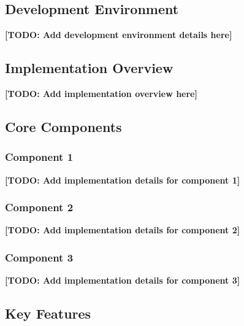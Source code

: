 
\subsection{Development Environment}


\textbf{[TODO: Add development environment details here]}

\subsection{Implementation Overview}


\textbf{[TODO: Add implementation overview here]}

\subsection{Core Components}


\subsubsection{Component 1}
\textbf{[TODO: Add implementation details for component 1]}

\subsubsection{Component 2}
\textbf{[TODO: Add implementation details for component 2]}

\subsubsection{Component 3}
\textbf{[TODO: Add implementation details for component 3]}

\subsection{Key Features}


